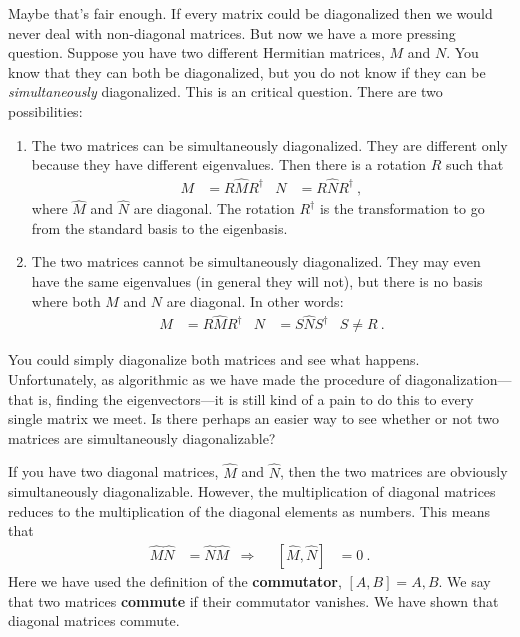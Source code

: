 \documentclass[12pt, oneside]{report}    %
\begin{document}
Maybe that's fair enough. If every matrix could be diagonalized then we would never deal with non-diagonal matrices. But now we have a more pressing question. Suppose you have two different Hermitian matrices, $M$ and $N$. You know that they can both be diagonalized, but you do not know if they can be \emph{simultaneously} diagonalized. This is an critical question. There are two possibilities:
\begin{enumerate}
    \item The two matrices can be simultaneously diagonalized. They are different only because they have different eigenvalues. Then there is a rotation $R$ such that 
    \begin{align}
        M &= R \hat M R^\dag
        &
        N &= R \hat N R^\dag \ ,
    \end{align}
    where $\hat M$ and $\hat N$ are diagonal. The rotation $R^\dag$ is the transformation to go from the standard basis to the eigenbasis.
    \item The two matrices cannot be simultaneously diagonalized. They may even have the same eigenvalues (in general they will not), but there is no basis where both $M$ and $N$ are diagonal. In other words:
     \begin{align}
        M &= R \hat M R^\dag
        &
        N &= S \hat N S^\dag 
        &
        S\neq R \ .
    \end{align}
\end{enumerate}
You could simply diagonalize both matrices and see what happens. Unfortunately, as algorithmic as we have made the procedure of diagonalization---that is, finding the eigenvectors---it is still kind of a pain to do this to every single matrix we meet. Is there perhaps an easier way to see whether or not two matrices are simultaneously diagonalizable?

\begin{example}
If you have two diagonal matrices, $\hat M$ and $\hat N$, then the two matrices are obviously simultaneously diagonalizable. However, the multiplication of diagonal matrices reduces to the multiplication of the diagonal elements as numbers. This means that
\begin{align}
    \hat M \hat N &= \hat N \hat M
    &\Rightarrow&&
    \left[\hat M, \hat N\right] &= 0
    \ .
\end{align}
Here we have used the definition of the \textbf{commutator}, $[A,B] = A,B$. We say that two matrices \textbf{commute} if their commutator vanishes. We have shown that diagonal matrices commute.
\end{example}
\end{document}
